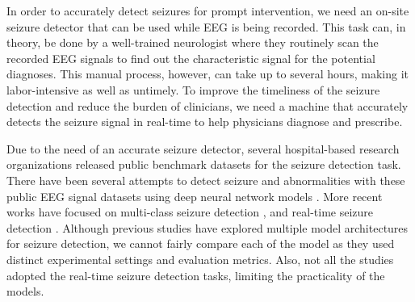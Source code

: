 \documentclass[pmlr,twocolumn,10pt]{jmlr}
\begin{document}
In order to accurately detect seizures for prompt intervention, we need an on-site seizure detector that can be used while EEG is being recorded.
This task can, in theory, be done by a well-trained neurologist where they routinely scan the recorded EEG signals to find out the characteristic signal for the potential diagnoses. 
This manual process, however, can take up to several hours, making it labor-intensive as well as untimely.
To improve the timeliness of the seizure detection and reduce the burden of clinicians, we need a machine that accurately detects the seizure signal in real-time to help physicians diagnose and prescribe.


Due to the need of an accurate seizure detector, several hospital-based research organizations released public benchmark datasets \citep{obeid2016temple, shah2018temple, shoeb2009application, goldberger2000physiobank, andrzejak2001indications} for the seizure detection task.
There have been several attempts to detect seizure and abnormalities with these public EEG signal datasets using deep neural network models \citep{acharya2018deep, roy2019chrononet, mohsenvand2020contrastive, golmohammadi2017gated, akbarian2020framework, zabihi2015analysis}.
More recent works have focused on multi-class seizure detection \citep{sriraam2019convolutional, daoud2019efficient, ahmedt2020neural, priyasad2021interpretable, jia2022variable}, and real-time seizure detection \citep{shawki2020deep, bomela2020real, thyagachandran2020seizure, fan2018detecting}. Although previous studies have explored multiple model architectures for seizure detection, we cannot fairly compare each of the model as they used distinct experimental settings and evaluation metrics.
Also, not all the studies adopted the real-time seizure detection tasks, limiting the practicality of the models.
 
\end{document}
